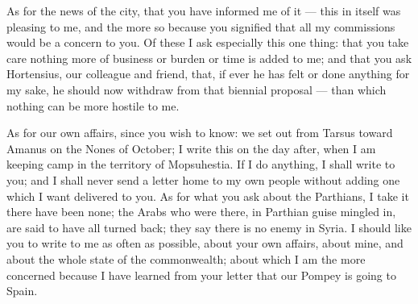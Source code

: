  As for the news of the city, that you have informed me of it --- this in itself was pleasing to me, and the more so because you signified that all my commissions would be a concern to you. Of these I ask especially this one thing: that you take care nothing more of business or burden or time is added to me; and that you ask Hortensius, our colleague and friend, that, if ever he has felt or done anything for my sake, he should now withdraw from that biennial proposal --- than which nothing can be more hostile to me.

 As for our own affairs, since you wish to know: we set out from Tarsus toward Amanus on the Nones of October; I write this on the day after, when I am keeping camp in the territory of Mopsuhestia. If I do anything, I shall write to you; and I shall never send a letter home to my own people without adding one which I want delivered to you. As for what you ask about the Parthians, I take it there have been none; the Arabs who were there, in Parthian guise mingled in, are said to have all turned back; they say there is no enemy in Syria. I should like you to write to me as often as possible, about your own affairs, about mine, and about the whole state of the commonwealth; about which I am the more concerned because I have learned from your letter that our Pompey is going to Spain.
